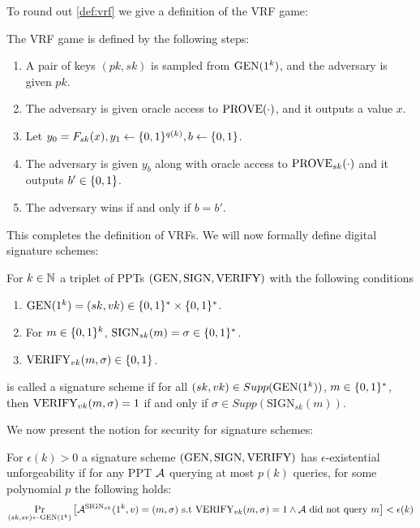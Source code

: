 To round out \cref{def:vrf} we give a definition of the VRF game:
\begin{definition} \label{def:vrf_game}
The VRF game is defined by the following steps:
\begin{enumerate}
	\item A pair of keys $(pk,sk)$ is sampled from $\text{GEN}(1^k)$, and the adversary is given $pk$.
	\item The adversary is given oracle access to $\text{PROVE}(\cdot)$, and it outputs a value $x$.
	\item Let $y_0 = F_{sk}(x), y_1 \leftarrow \{0,1\}^{q(k)}, b \leftarrow \{0,1\}$.
	\item The adversary is given $y_b$ along with oracle access to $\text{PROVE}_{sk}(\cdot)$ and it outputs $b' \in \{0,1\}$.
	\item The adversary wins if and only if $b = b'$.
\end{enumerate}	
\end{definition}

\newcommand{\sig}{\text{SIGN}}

This completes the definition of VRFs. We will now formally define digital signature schemes:
\begin{definition} \label{def:sig_sch}
For $k \in {\mathbb{N}}$ a triplet of PPTs $(\gen,\sig,\ver)$ with the following conditions
\begin{enumerate}
	\item $\text{GEN}(1^k) = (sk,vk) \in \{0,1\}^* \times \{0,1\}^*$.
	\item For $m \in \{0,1\}^k$, $\sig_{sk}(m) = \sigma \in \zo^*$.
	\item $\text{VERIFY}_{vk}(m,\sigma) \in \{0,1\}$.
\end{enumerate}	
is called a signature scheme if for all $(sk,vk) \in Supp(\text{GEN}(1^k))$, $m \in \{0,1\}^*$, then $\text{VERIFY}_{vk}(m,\sigma) = 1$ if and only if $\sigma \in Supp(\sig_{sk}(m))$.
\end{definition}

We now present the notion for security for signature schemes:
\begin{definition} \label{def:eu}
	For $\epsilon(k) > 0$ a signature scheme $(\gen,\sig,\ver)$ has $\epsilon$-existential unforgeability if for any PPT $\mathcal{A}$ querying at most $p(k)$ queries, for some polynomial $p$ the following holds:
	$$\ppr{(sk,sv) \leftarrow \gen(1^k)}{\cA^{\sig_{sk}}(1^k,v) = (m,\sigma) \text{ s.t } \ver_{vk}(m,\sigma) = 1 \land \cA \text{ did not query } m } < \epsilon(k) $$
\end{definition}

